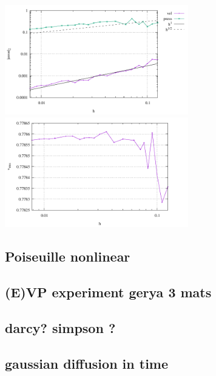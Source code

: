 \documentclass[a4paper]{article}
\begin{document}
\begin{center}
\includegraphics[width=8cm]{./results/benchmark_solvi/convergence.pdf}
\includegraphics[width=8cm]{./results/benchmark_solvi/vrms.pdf}
\end{center}



\subsection{Poiseuille nonlinear}

\subsection{(E)VP experiment gerya 3 mats}

\subsection{darcy? simpson ?}

\subsection{gaussian diffusion in time}






\newpage
\printbibliography
\end{document}
